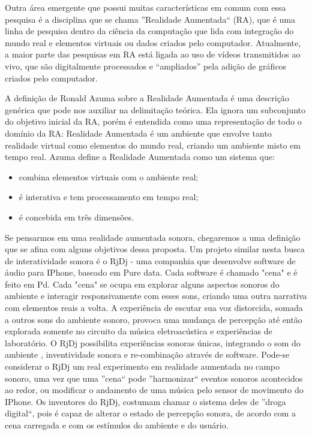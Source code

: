\documentclass{ppgmus}
\begin{document}
Outra área emergente que possui muitas características em comum com essa
pesquisa é a disciplina que se chama ''Realidade Aumentada`` (RA), que é uma linha de pesquisa dentro da ciência da computação que lida com 
integração do mundo real e elementos virtuais ou dados criados pelo computador. Atualmente, a 
maior parte das pesquisas em RA está ligada ao uso de vídeos transmitidos ao vivo, que são 
digitalmente processados e “ampliados” pela adição de gráficos criados pelo computador.

A definição de Ronald Azuma 
sobre a Realidade Aumentada \cite{azuma97:ar} é uma descrição genérica que pode nos auxiliar na delimitação teórica. 
Ela ignora um subconjunto do objetivo inicial da RA, porém é entendida como uma representação 
de todo o domínio da RA: Realidade Aumentada é um ambiente que envolve tanto realidade virtual 
como elementos do mundo real, criando um ambiente misto em tempo real.
Azuma define a Realidade Aumentada como um sistema que:
\begin{itemize}
 \item combina elementos virtuais com o ambiente real; 
  \item é interativa e tem processamento em tempo real; 
  \item  é concebida em três dimensões.
\end{itemize}

    
Se pensarmos em uma realidade aumentada sonora, chegaremos a uma definição que se afina 
com alguns objetivos dessa proposta.
Um projeto similar nesta busca de interatividade sonora é o RjDj - uma companhia que desenvolve 
software de áudio para IPhone, baseado em Pure data. Cada software 
é chamado "cena" e é feito em Pd. Cada "cena" se ocupa em explorar alguns 
aspectos sonoros do ambiente e interagir responsivamente com esses sons, criando uma 
outra narrativa com elementos reais a volta. A experiência de escutar sua voz distorcida,
somada a outros sons do ambiente sonoro, provoca uma mudança de percepção até então 
explorada somente no circuito da música eletroacústica e experiências de laboratório. 
O RjDj possibilita experiências sonoras únicas, integrando o som do ambiente , 
inventividade sonora e re-combinação através de software. Pode-se considerar o 
RjDj um real experimento em realidade aumentada no campo sonoro, uma vez que uma ''cena``
pode ''harmonizar`` eventos sonoros acontecidos ao redor, ou modificar o andamento de
uma música pelo sensor de movimento do IPhone. Os inventores do RjDj, costumam chamar 
o sistema deles de ''droga digital``, pois é capaz de alterar o estado de percepção sonora,
de acordo com a cena carregada e com os estímulos do ambiente e do usuário. 
\end{document}
